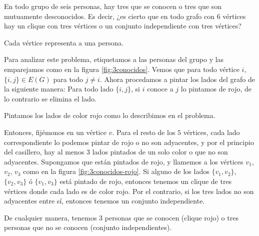 \begin{prob}
    En todo grupo de seis personas, hay tres que se conocen o tres que son mutuamente desconocidos. Es decir, ¿es cierto que en todo grafo con $6$ vértices hay un clique con tres vértices o un conjunto independiente con tres vértices?
    
    \begin{marginfigure}
        \centering
        \caption{Cada vértice representa a una persona.}
        \label{fig:3conocidos}
    \end{marginfigure}
    
    Para analizar este problema, etiquetamos a las personas del grupo y las emparejamos como en la figura \ref{fig:3conocidos}. Vemos que para todo vértice $i$, $\{i,j\} \in E(G)$ para todo $j \neq i$. Ahora procedamos a pintar los lados del grafo de la siguiente manera: Para todo lado $\{i,j\}$, si $i$ conoce a $j$ lo pintamos de rojo, de lo contrario se elimina el lado.
    
    \begin{marginfigure}
        \centering
        \caption{Pintamos los lados de color rojo como lo describimos en el problema.}
        \label{fig:3conocidos-rojo}
    \end{marginfigure}
    
    Entonces, fijémonos en un vértice $v$. Para el resto de los $5$ vértices, cada lado correspondiente lo podemos pintar de rojo o no son adyacentes, y por el principio del casillero, hay al menos $3$ lados pintados de un solo color o que no son adyacentes. Supongamos que están pintados de rojo, y llamemos a los vértices $v_1$, $v_2$, $v_3$ como en la figura \ref{fig:3conocidos-rojo}. Si alguno de los lados $\{v_1, v_2\}$, $\{v_2, v_3\}$ ó $\{v_1, v_3\}$ está pintado de rojo, entonces tenemos un clique de tres vértices donde cada lado es de color rojo. Por el contrario, si los tres lados no son adyacentes entre sí, entonces tenemos un conjunto independiente.
    
    De cualquier manera, tenemos $3$ personas que se conocen (clique rojo) o tres personas que no se conocen (conjunto independientes).
\end{prob}